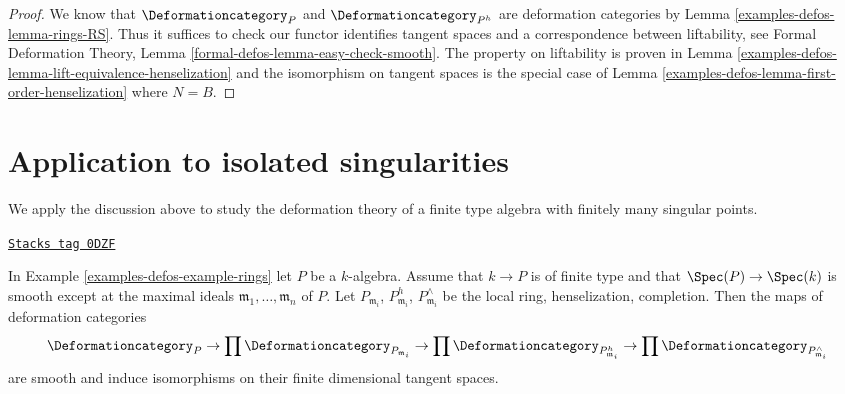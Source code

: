 \begin{proof}
We know that $\Deformationcategory_P$ and $\Deformationcategory_{P^h}$
are deformation categories by Lemma \ref{examples-defos-lemma-rings-RS}.
Thus it suffices to check
our functor identifies tangent spaces and a correspondence
between liftability, see
Formal Deformation Theory, Lemma \ref{formal-defos-lemma-easy-check-smooth}.
The property on liftability is proven in
Lemma \ref{examples-defos-lemma-lift-equivalence-henselization}
and the isomorphism on tangent spaces is the special case of
Lemma \ref{examples-defos-lemma-first-order-henselization} where $N = B$.
\end{proof}

\section{Application to isolated singularities}
\label{examples-defos-section-isolated}
We apply the discussion above to study the deformation theory
of a finite type algebra with finitely many singular points.

\begin{lemma}[Isolated]
\label{examples-defos-lemma-isolated}
\href{https://stacks.math.columbia.edu/tag/0DZF}{\texttt{Stacks tag 0DZF}}

In Example \ref{examples-defos-example-rings} let $P$ be a $k$-algebra.
Assume that $k \to P$ is of finite type and that $\Spec(P) \to \Spec(k)$
is smooth except at the maximal ideals
$\mathfrak m_1, \ldots, \mathfrak m_n$ of $P$.
Let $P_{\mathfrak m_i}$, $P_{\mathfrak m_i}^h$, $P_{\mathfrak m_i}^\wedge$
be the local ring, henselization, completion.
Then the maps of deformation categories
$$
\Deformationcategory_P \to
\prod \Deformationcategory_{P_{\mathfrak m_i}} \to
\prod \Deformationcategory_{P_{\mathfrak m_i}^h} \to
\prod \Deformationcategory_{P_{\mathfrak m_i}^\wedge}
$$
are smooth and induce isomorphisms on their finite dimensional
tangent spaces.
\end{lemma}

